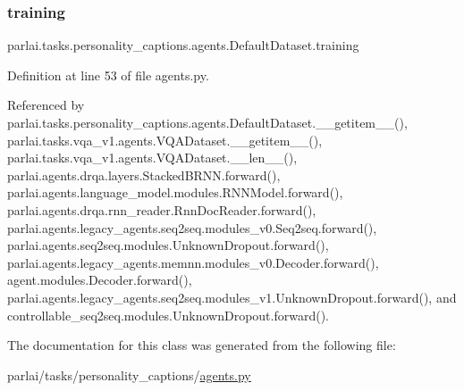 \mbox{\label{classparlai_1_1tasks_1_1personality__captions_1_1agents_1_1DefaultDataset_a859342ffaf7f760cda952bc662cd7da3}} 
\subsubsection{\texorpdfstring{training}{training}}
{\footnotesize\ttfamily parlai.\+tasks.\+personality\+\_\+captions.\+agents.\+Default\+Dataset.\+training}



Definition at line 53 of file agents.\+py.



Referenced by parlai.\+tasks.\+personality\+\_\+captions.\+agents.\+Default\+Dataset.\+\_\+\+\_\+getitem\+\_\+\+\_\+(), parlai.\+tasks.\+vqa\+\_\+v1.\+agents.\+V\+Q\+A\+Dataset.\+\_\+\+\_\+getitem\+\_\+\+\_\+(), parlai.\+tasks.\+vqa\+\_\+v1.\+agents.\+V\+Q\+A\+Dataset.\+\_\+\+\_\+len\+\_\+\+\_\+(), parlai.\+agents.\+drqa.\+layers.\+Stacked\+B\+R\+N\+N.\+forward(), parlai.\+agents.\+language\+\_\+model.\+modules.\+R\+N\+N\+Model.\+forward(), parlai.\+agents.\+drqa.\+rnn\+\_\+reader.\+Rnn\+Doc\+Reader.\+forward(), parlai.\+agents.\+legacy\+\_\+agents.\+seq2seq.\+modules\+\_\+v0.\+Seq2seq.\+forward(), parlai.\+agents.\+seq2seq.\+modules.\+Unknown\+Dropout.\+forward(), parlai.\+agents.\+legacy\+\_\+agents.\+memnn.\+modules\+\_\+v0.\+Decoder.\+forward(), agent.\+modules.\+Decoder.\+forward(), parlai.\+agents.\+legacy\+\_\+agents.\+seq2seq.\+modules\+\_\+v1.\+Unknown\+Dropout.\+forward(), and controllable\+\_\+seq2seq.\+modules.\+Unknown\+Dropout.\+forward().



The documentation for this class was generated from the following file\+:\begin{DoxyCompactItemize}
\item 
parlai/tasks/personality\+\_\+captions/\hyperlink{parlai_2tasks_2personality__captions_2agents_8py}{agents.\+py}\end{DoxyCompactItemize}
